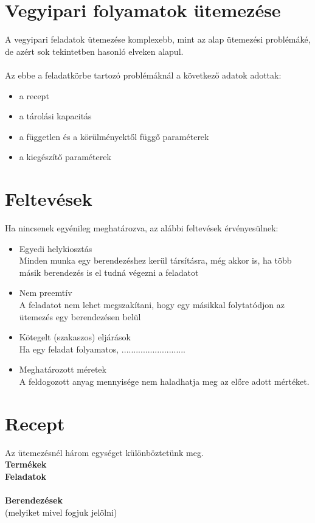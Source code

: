 \documentclass {report}
\begin{document}
 \subsection{}
 
 \section{Vegyipari folyamatok ütemezése}
 A vegyipari feladatok ütemezése komplexebb, mint az alap ütemezési problémáké, de azért sok tekintetben hasonló elveken alapul. \\ \\Az ebbe a feladatkörbe tartozó problémáknál a következő adatok adottak:
 
 \begin{itemize}
 \item  a recept
  \item a tárolási kapacitás
  \item a független és a körülményektől függő paraméterek
  \item  a kiegészítő paraméterek
 \end{itemize}
 
 \section{Feltevések}
 Ha nincsenek egyénileg meghatározva, az alábbi feltevések érvényesülnek:
 \begin{itemize}
 \item Egyedi helykiosztás\\Minden munka egy berendezéshez kerül társításra, még akkor is, ha több másik berendezés is el tudná végezni a feladatot
 \item Nem preemtív\\A feladatot nem lehet megszakítani, hogy egy másikkal folytatódjon az ütemezés egy berendezésen belül
 \item Kötegelt (szakaszos) eljárások\\Ha egy feladat folyamatos, ...........................
 \item Meghatározott méretek\\A feldogozott anyag mennyisége nem haladhatja meg az előre adott mértéket. 
  \end{itemize}
 \section{Recept}
 Az ütemezésnél három egységet különböztetünk meg.\\
 \textbf{Termékek}\\
 \textbf{Feladatok} \\ \\
 \textbf{Berendezések} \\
  (melyiket mivel fogjuk jelölni)
  
\end{document}
